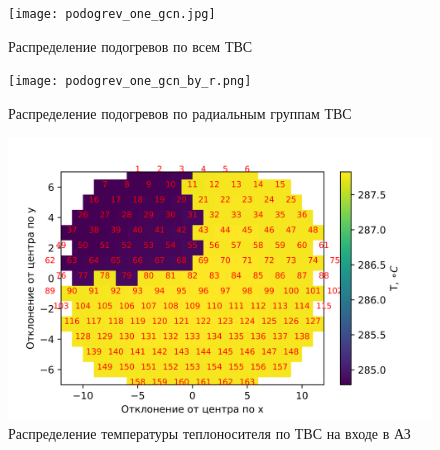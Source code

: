 \begin{figure}[H]
	\begin{center}
		\texttt{[image: podogrev\_one\_gcn.jpg]}
		\caption{Распределение подогревов по всем ТВС}
		\label{pic:podogrev-one-gcn} %
	\end{center}
\end{figure}

\begin{figure}[H]
	\begin{center}
		\texttt{[image: podogrev\_one\_gcn\_by\_r.png]}
		\caption{Распределение подогревов по радиальным группам ТВС}
		\label{pic:podogrev-one-gcn-by-r} %
	\end{center}
\end{figure}

\begin{figure}[H]
	\begin{center}
		\includegraphics{treton_one_gcn_t_all_cells_z_is_0.png}
		\caption{Распределение температуры теплоносителя по ТВС на входе в АЗ}
		\label{pic:treton-one-gcn-t-all-cells-is-0} %
	\end{center}
\end{figure}

